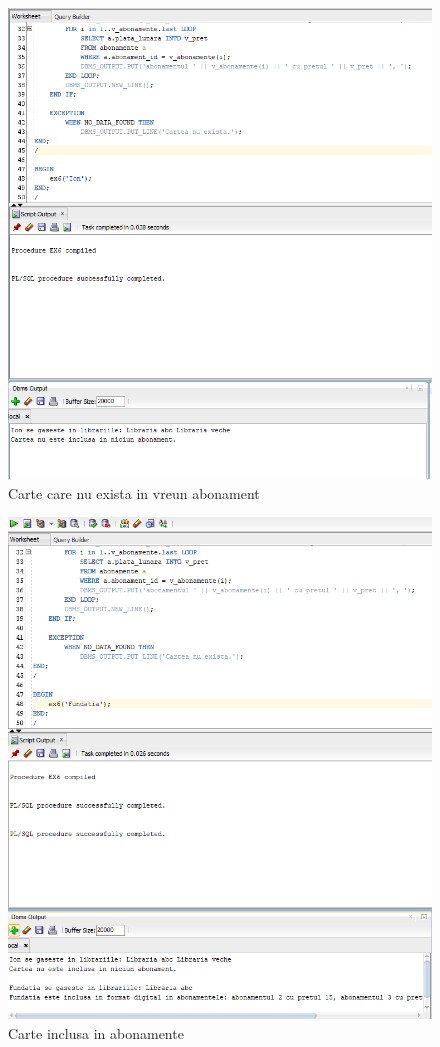 \documentclass[12pt]{article}
\begin{document}
\begin{figure}[!htb]
	\includegraphics[max width=\linewidth]{imgs/ex6_1.png}
	\caption{Carte care nu exista in vreun abonament}
	\label{fig:ex6_1}
\end{figure}
\begin{figure}[!htb]
\includegraphics[max width=\linewidth]{imgs/ex6_2.png}
\caption{Carte inclusa in abonamente}
\label{fig:ex6_2}
\end{figure}
\end{document}
